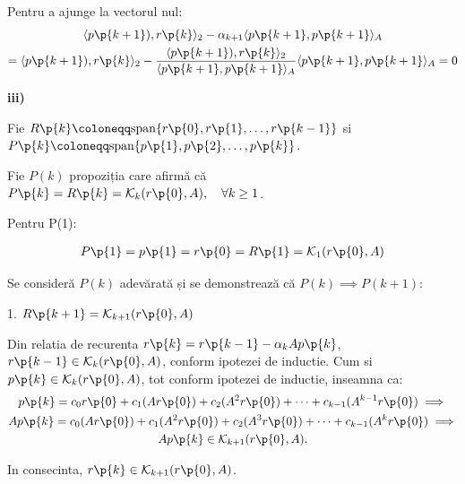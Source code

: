 \begin{demonstratie}
    \newpage

    Pentru a ajunge la vectorul nul:
    \begin{gather*}
        \langle p\p{k+1}), r\p{k} \rangle_2 - \alpha_{k+1} \langle p\p{k+1}, p\p{k+1} \rangle_A \\
        = \langle p\p{k+1}), r\p{k} \rangle_2 - \frac{\langle p\p{k+1}), r\p{k} \rangle_2}{\langle p\p{k+1}, p\p{k+1} \rangle_A} \langle p\p{k+1}, p\p{k+1} \rangle_A = 0 
    \end{gather*}

    \noindent \textbf{iii)}

    Fie $ R\p{k} \coloneqq \text{span} \{ r\p{0}, r\p{1}, \dots, r\p{k-1} \} $ si $ P\p{k} \coloneqq \text{span} \{ p\p{1}, p\p{2}, \dots, p\p{k} \} $.  

    \medskip

    Fie $ P(k) $ propoziția care afirmă că $ P\p{k} = R\p{k} = \mathcal{K}_k(r\p{0}, A), \quad \forall k \ge 1$.

    \medskip

    Pentru P(1):

    \begin{align*}
        P\p{1} = p\p{1} = r\p{0} = R\p{1} = \mathcal{K}_1(r\p{0}, A)
    \end{align*}

    Se consideră $ P(k) $ adevărată și se demonstrează că $ P(k) \implies P(k + 1) $:

    \bigskip 

    1. $ R\p{k + 1} = \mathcal{K}_{k + 1}(r\p{0}, A) $

    \medskip

    Din relatia de recurenta $r\p{k} = r\p{k-1} - \alpha_k A p\p{k} $, $ r\p{k - 1} \in \mathcal{K}_k(r\p{0}, A) $, conform ipotezei de inductie. Cum si $ p\p{k} \in \mathcal{K}_k(r\p{0}, A) $, tot conform ipotezei de inductie, inseamna ca:
    \begin{gather*}
        p\p{k} = c_0 r\p{0} + c_1 (A r\p{0}) + c_2 (A^2 r\p{0}) + \dots + c_{k-1} (A^{k-1} r\p{0}) \implies \\
        A p\p{k} = c_0 (A r\p{0}) + c_1 (A^2 r\p{0}) + c_2 (A^3 r\p{0}) + \dots + c_{k-1} (A^k r\p{0}) \implies \\
        A p\p{k} \in \mathcal{K}_{k + 1}(r\p{0}, A).
    \end{gather*}

    In consecinta, $ r\p{k} \in \mathcal{K}_{k + 1}(r\p{0}, A) $. 

    \medskip


\end{demonstratie}
